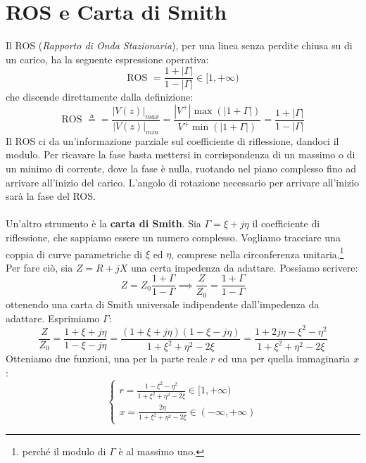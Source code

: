 \documentclass{book}
\begin{document}
    \section*{ROS e Carta di Smith}
        Il ROS (\textit{Rapporto di Onda Stazionaria}), per una linea senza perdite chiusa su di un carico, ha la seguente espressione operativa:
        \begin{equation}
            \textrm{ROS } = \frac{1+|\Gamma|}{1-|\Gamma|} \in [1, + \infty)
        \end{equation}
        che discende direttamente dalla definizione:
        \begin{equation}
            \textrm{ROS } \triangleq = \frac{|V(z)|_{max}}{|V(z)|_{min}} = \frac{|V^{+}|\max(|1+\Gamma|)}{V^{+}\min(|1+\Gamma|)} = \frac{1+|\Gamma|}{1-|\Gamma|} 
        \end{equation}
        Il ROS ci da un'informazione parziale sul coefficiente di riflessione, dandoci il modulo. Per ricavare la fase basta mettersi in corrispondenza di un massimo o di un minimo
        di corrente, dove la fase è nulla, ruotando nel piano complesso fino ad arrivare all'inizio del carico. L'angolo di rotazione necessario per arrivare all'inizio sarà la fase del ROS.
        \\ \\ 
        Un'altro strumento è la \textbf{carta di Smith}. Sia $\Gamma = \xi +j \eta$ il coefficiente di riflessione, che sappiamo essere un numero complesso.
        Vogliamo tracciare una coppia di curve parametriche di $\xi$ ed $\eta$, comprese nella circonferenza unitaria.\footnote{perché il modulo di $\Gamma$ è al massimo uno.} \\
        Per fare ciò, sia $Z=R+jX$ una certa impedenza da adattare. Possiamo scrivere:
        \begin{equation}
            Z=Z_{0}\frac{1+\Gamma}{1-\Gamma} \implies \frac{Z}{Z_{0}} =\frac{1+\Gamma}{1-\Gamma}
        \end{equation}
        ottenendo una carta di Smith universale indipendente dall'impedenza da adattare. Esprimiamo $\Gamma$:
        \begin{equation}
            \frac{Z}{Z_{0}}=\frac{1+\xi+j\eta}{1-\xi-j\eta} = \frac{(1+\xi+j\eta)(1-\xi-j\eta)}{1+\xi ^{2}+\eta ^{2}-2\xi} = \frac{1+2j\eta - \xi ^{2} -\eta ^{2}}{1+\xi ^{2} + \eta ^{2}- 2 \xi}
        \end{equation}
        Otteniamo due funzioni, una per la parte reale  $r$ ed una per quella immaginaria $x$:
        \begin{equation}
            \begin{cases}
                \displaystyle r = \frac{1-\xi ^{2}-\eta ^{2}}{1+\xi ^{2}+\eta ^{2}-2\xi} \in [1, +\infty) \\
                \displaystyle x = \frac{2 \eta}{1+\xi ^{2}+\eta ^{2}-2\xi} \in (-\infty, + \infty)
            \end{cases}
        \end{equation}
\end{document}
